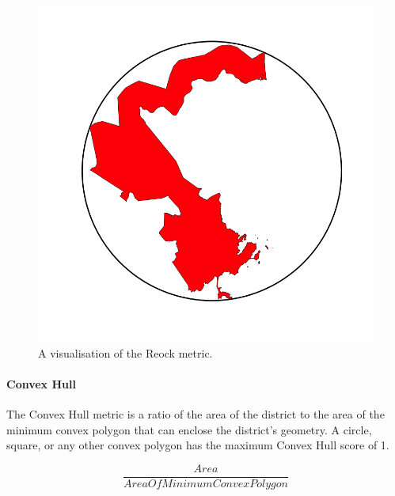 \documentclass[]{article}
\let\oldparagraph\paragraph
\renewcommand{\paragraph}[1]{\oldparagraph{#1}\mbox{}}
\begin{document}
\begin{figure}
\centering
\includegraphics{img/reock.png}
\caption{A visualisation of the Reock metric.}
\end{figure}

\hypertarget{convex-hull}{%
\paragraph{Convex Hull}\label{convex-hull}}

The Convex Hull metric is a ratio of the area of the district to the
area of the minimum convex polygon that can enclose the district's
geometry. A circle, square, or any other convex polygon has the maximum
Convex Hull score of 1.

\[\frac{Area}{AreaOfMinimumConvexPolygon}\]
\end{document}
